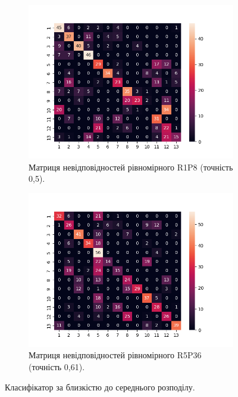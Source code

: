 \begin{figure}[h]
    \begin{subfigure}{0.5\textwidth}
    \includegraphics[width=0.95\linewidth]{img/confusion/hist_R1_P8_u.png}
    \caption{
        Матриця невідповідностей рівномірного R1P8 (точність 0,5).
    }
    \end{subfigure}%
    \begin{subfigure}{0.5\textwidth}
    \includegraphics[width=0.95\linewidth]{img/confusion/hist_R5_P36_u.png}
    \caption{
        Матриця невідповідностей рівномірного R5P36 (точність 0,61).
    }
    \end{subfigure}%
    
    \caption{Класифікатор за близкістю до середнього розподілу.}
    \label{fig:precision-1}
\end{figure}

